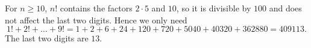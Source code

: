 For $n\ge10$, $n!$ contains the factors $2\cdot5$ and $10$, so it is divisible by $100$ and does not affect the last two digits. Hence we only need
\[
1!+2!+\dots+9!=1+2+6+24+120+720+5040+40320+362880=409113 .
\]
The last two digits are $\boxed{13}$.
